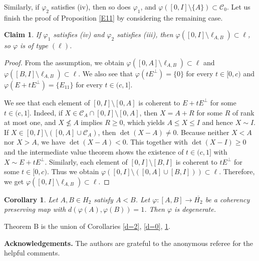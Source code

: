 \documentclass[10pt]{amsart}
\newtheorem{corollary}[theorem]{Corollary}
\newtheorem{claim}[theorem]{Claim}
\theoremstyle{definition}
\theoremstyle{remark}
\numberwithin{subsection}{section}
\numberwithin{equation}{section}
\newcommand\cC{{\mathcal{C}}}
\newcommand\oH{{\overline{H_2}}}
\begin{document}
Similarly,  if $\varphi_2$ satisfies (iv), then so does $\varphi_1$, and $\varphi([0, I]\setminus\{A\})\subset \cC_0$.
Let us finish the proof of Proposition \ref{E11} by considering the remaining case.

\begin{claim}
If $\varphi_1$ satisfies (iv) and $\varphi_2$ satisfies (iii), then $\varphi([0, I]\setminus\ell_{A, B})\subset\ell$, so $\varphi$ is of type $(\ell)$.
\end{claim}
\begin{proof}
From the assumption, we obtain $\varphi ([0, A] \setminus \ell_{A,B}) \subset \ell$ and $\varphi ([B, I] \setminus \ell_{A,B}) \subset \ell$.
We also see that $\varphi(tE^\perp)=\{0\}$ for every $t\in [0,c)$ and $\varphi(E+tE^\perp)=\{E_{11}\}$ for every $t\in (c, 1]$.

We see that each element of $[0, I]\setminus[0, A]$ is coherent to $E+tE^\perp$ for some $t\in (c, 1]$.
Indeed, if $X\in \cC_A\cap[0, I]\setminus[0, A]$, then $X=A+R$ for some $R$ of rank at most one, and $X \not\le A$ implies $R \ge 0$, which yields $A\leq X\leq I$ and hence $X\sim I$.
If $X\in [0, I]\setminus([0, A]\cup \cC_A)$, then $\det (X-A) \not= 0$. Because neither $X <A$ nor $X > A$, we have $\det (X-A) < 0$. This together with $\det (X-I)\geq 0$ and 
the intermediate value theorem shows the existence of $t\in (c, 1]$ with $X\sim E+tE^\perp$.
Similarly, each element of $[0, I]\setminus[B, I]$ is coherent to $tE^\perp$ for some $t\in [0,c)$.
Thus we obtain $\varphi([0, I]\setminus([0, A]\cup[B, I]))\subset \ell$. 
Therefore, we get $\varphi([0, I]\setminus\ell_{A, B})\subset\ell$.
\end{proof}


\begin{corollary}\label{d=1}
Let $A, B\in H_2$ satisfy $A<B$. 
Let $\varphi\colon [A, B]\to \oH$ be a coherency preserving map with $d(\varphi(A),\varphi(B))=1$. 
Then $\varphi$ is degenerate.
\end{corollary}

Theorem B is the union of Corollaries \ref{d=2}, \ref{d=0}, \ref{d=1}.

\medskip

\noindent\textbf{Acknowledgements.} \quad 
The authors are grateful to the anonymous referee for the helpful comments.




%
\end{document}
